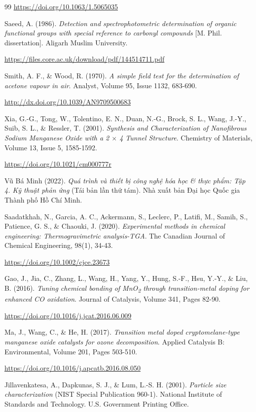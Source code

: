 \documentclass{article} %
\begin{document}
\begin{thebibliography}{99}
\url{https://doi.org/10.1063/1.5065035}

Saeed, A. (1986). \textit{Detection and spectrophotometric determination of organic functional groups with special reference to carbonyl compounds} [M. Phil. dissertation]. Aligarh Muslim University.

\url{https://files.core.ac.uk/download/pdf/144514711.pdf}

Smith, A. F., \& Wood, R. (1970). \textit{A simple field test for the determination of acetone vapour in air}. Analyst, Volume 95, Issue 1132, 683-690.

\url{http://dx.doi.org/10.1039/AN9709500683}

Xia, G.-G., Tong, W., Tolentino, E. N., Duan, N.-G., Brock, S. L., Wang, J.-Y., Suib, S. L., \& Ressler, T. (2001). \textit{Synthesis and Characterization of Nanofibrous Sodium Manganese Oxide with a 2 $\times$ 4 Tunnel Structure}. Chemistry of Materials, Volume 13, Issue 5, 1585-1592.

\url{https://doi.org/10.1021/cm000777r}

Vũ Bá Minh (2022). \textit{Quá trình và thiết bị công nghệ hóa học \& thực phẩm: Tập 4. Kỹ thuật phản ứng} (Tái bản lần thứ tám). Nhà xuất bản Đại học Quốc gia Thành phố Hồ Chí Minh.

Saadatkhah, N., Garcia, A. C., Ackermann, S., Leclerc, P., Latifi, M., Samih, S., Patience, G. S., \& Chaouki, J. (2020). \textit{Experimental methods in chemical engineering: Thermogravimetric analysis-TGA}. The Canadian Journal of Chemical Engineering, 98(1), 34-43.

\url{https://doi.org/10.1002/cjce.23673}

Gao, J., Jia, C., Zhang, L., Wang, H., Yang, Y., Hung, S.-F., Hsu, Y.-Y., \& Liu, B. (2016). \textit{Tuning chemical bonding of MnO\textsubscript{2} through transition-metal doping for enhanced CO oxidation}. Journal of Catalysis, Volume 341, Pages 82-90.

\url{https://doi.org/10.1016/j.jcat.2016.06.009}

Ma, J., Wang, C., \& He, H. (2017). \textit{Transition metal doped cryptomelane-type manganese oxide catalysts for ozone decomposition}. Applied Catalysis B: Environmental, Volume 201, Pages 503-510.

\url{https://doi.org/10.1016/j.apcatb.2016.08.050}

Jillavenkatesa, A., Dapkunas, S. J., \& Lum, L.-S. H. (2001).  
\textit{Particle size characterization} (NIST Special Publication 960-1). National Institute of Standards and Technology. U.S. Government Printing Office.


\end{thebibliography}
\end{document}
